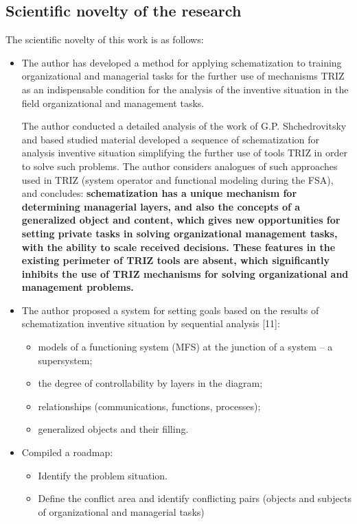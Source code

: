 \subsection{Scientific novelty of the research}
The scientific novelty of this work is as follows:
\begin{itemize}
\item The author has developed a method for applying schematization to
  training organizational and managerial tasks for the further use of
  mechanisms TRIZ as an indispensable condition for the analysis of the
  inventive situation in the field organizational and management tasks.

  The author conducted a detailed analysis of the work of G.P. Shchedrovitsky
  and based studied material developed a sequence of schematization for
  analysis inventive situation simplifying the further use of tools TRIZ in
  order to solve such problems. The author considers analogues of such
  approaches used in TRIZ (system operator and functional modeling during the
  FSA), and concludes: \textbf{schematization has a unique mechanism for
    determining managerial layers, and also the concepts of a generalized
    object and content, which gives new opportunities for setting private
    tasks in solving organizational management tasks, with the ability to
    scale received decisions. These features in the existing perimeter of TRIZ
    tools are absent, which significantly inhibits the use of TRIZ mechanisms
    for solving organizational and management problems.}
\item The author proposed a system for setting goals based on the results of schematization
inventive situation by sequential analysis [11]:
\begin{itemize}
\item models of a functioning system (MFS) at the junction of a system -- a
  supersystem;
\item the degree of controllability by layers in the diagram;
\item relationships (communications, functions, processes);
\item generalized objects and their filling.
\end{itemize}
\item Compiled a roadmap:
\begin{itemize}
\item Identify the problem situation.
\item Define the conflict area and identify conflicting pairs (objects and
  subjects of organizational and managerial tasks)

\end{itemize}
\end{itemize}
